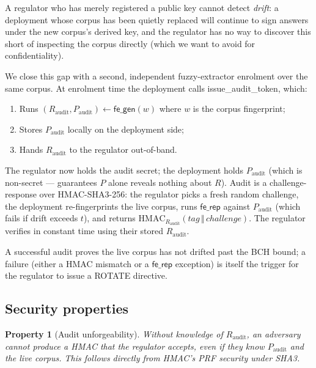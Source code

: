 \documentclass[11pt,a4paper]{article}
\newtheorem{property}{Property}
\begin{document}
A regulator who has merely registered a public key cannot detect
\emph{drift}: a deployment whose corpus has been quietly replaced
will continue to sign answers under the new corpus's derived key,
and the regulator has no way to discover this short of inspecting
the corpus directly (which we want to avoid for confidentiality).

We close this gap with a second, independent fuzzy\nobreakdash-extractor
enrolment over the same corpus.  At enrolment time the deployment
calls \textsf{issue\_audit\_token}, which:

\begin{enumerate}
  \item Runs $(R_{\mathrm{audit}}, P_{\mathrm{audit}}) \gets \mathsf{fe\_gen}(w)$
        where $w$ is the corpus fingerprint;
  \item Stores $P_{\mathrm{audit}}$ locally on the deployment side;
  \item Hands $R_{\mathrm{audit}}$ to the regulator out\nobreakdash-of\nobreakdash-band.
\end{enumerate}

The regulator now holds the audit secret; the deployment holds
$P_{\mathrm{audit}}$ (which is non\nobreakdash-secret —
\cite{dodis2008fuzzy} guarantees $P$ alone reveals nothing about
$R$).  Audit is a challenge\nobreakdash-response over HMAC\nobreakdash-SHA3-256:
the regulator picks a fresh random challenge, the deployment
re\nobreakdash-fingerprints the live corpus, runs $\mathsf{fe\_rep}$
against $P_{\mathrm{audit}}$ (which fails if drift exceeds $t$),
and returns $\mathrm{HMAC}_{R_{\mathrm{audit}}}(\mathit{tag} \,\Vert\,
\mathit{challenge})$.  The regulator verifies in constant time
using their stored $R_{\mathrm{audit}}$.

A successful audit proves the live corpus has not drifted past the
BCH bound; a failure (either a HMAC mismatch or a
$\mathsf{fe\_rep}$ exception) is itself the trigger for the
regulator to issue a \textsf{ROTATE} directive.

\subsection{Security properties}
\label{sec:regulator:security}

\begin{property}[Audit unforgeability]
  Without knowledge of $R_{\mathrm{audit}}$, an adversary cannot
  produce a HMAC that the regulator accepts, even if they know
  $P_{\mathrm{audit}}$ and the live corpus.  This follows directly
  from HMAC's PRF security under SHA3.
\end{property}
\end{document}
